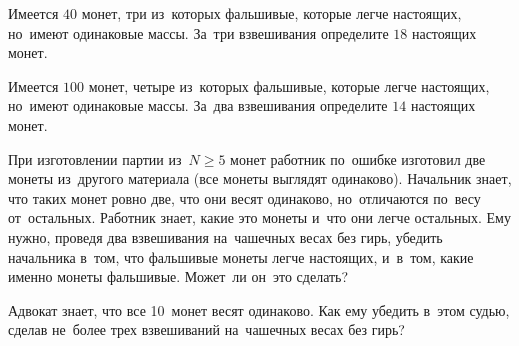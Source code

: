 \begin{problems}
\item
Имеется $40$ монет, три из~которых
фальшивые, которые легче настоящих, но~имеют одинаковые массы.
За~три взвешивания определите $18$ настоящих монет.

\item
Имеется $100$ монет, четыре из~которых
фальшивые, которые легче настоящих, но~имеют одинаковые массы.
За~два взвешивания определите $14$ настоящих монет.

\item
При изготовлении партии из~$N \geq 5$  монет работник по~ошибке изготовил
две монеты из~другого материала (все монеты выглядят одинаково).
Начальник знает, что таких монет ровно две, что они весят одинаково,
но~отличаются по~весу от~остальных.
Работник знает, какие это монеты и~что они легче остальных.
Ему нужно, проведя два взвешивания на~чашечных весах без гирь, убедить
начальника в~том, что фальшивые монеты легче настоящих, и~в~том, какие именно
монеты фальшивые.
Может~ли он~это сделать?

\item
Адвокат знает, что все 10~монет весят одинаково.
Как ему убедить в~этом судью, сделав не~более трех взвешиваний на~чашечных
весах без гирь?

\end{problems}

